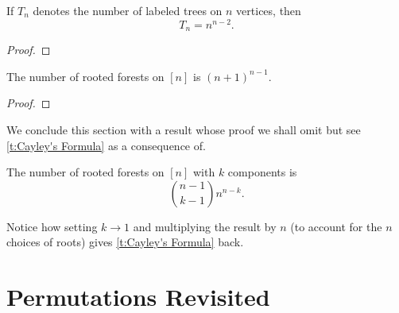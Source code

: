 \begin{theorem}
If $T_n$ denotes the number of labeled trees on $n$ vertices, then
    \[
    T_n = n^{n-2}.
    \]
    \label{t:Cayley's Formula}
\end{theorem}
\begin{proof}
\end{proof}
\begin{theorem}
The number of rooted forests on $[n]$ is $(n+1)^{n-1}$.
\end{theorem}
\begin{proof}

\end{proof}
We conclude this section with a result whose proof we shall omit but see \cref{t:Cayley's Formula} as a consequence of. 
\begin{theorem}
    The number of rooted forests on $[n]$ with $k$ components is \[
    \binom{n-1}{k-1}n^{n-k}.
    \]
\end{theorem}
Notice how setting $k\to 1$ and multiplying the result by $n$ (to account for the $n$ choices of roots) gives \cref{t:Cayley's Formula} back. 
\section{Permutations Revisited}








\endinput
